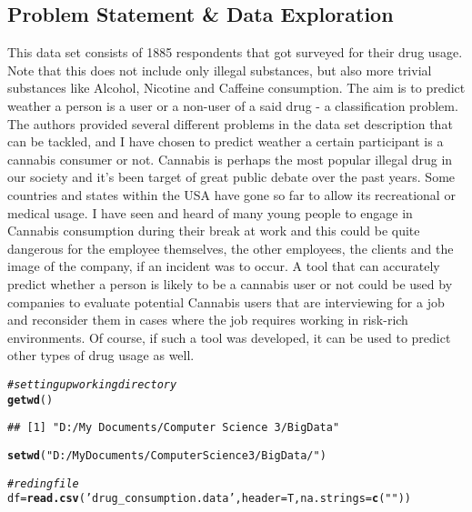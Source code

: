 \documentclass{article}\usepackage[]{graphicx}\usepackage[]{color}
\makeatletter
\newcommand{\hlstr}[1]{\textcolor[rgb]{0.192,0.494,0.8}{#1}}%
\newcommand{\hlcom}[1]{\textcolor[rgb]{0.678,0.584,0.686}{\textit{#1}}}%
\newcommand{\hlstd}[1]{\textcolor[rgb]{0.345,0.345,0.345}{#1}}%
\newcommand{\hlkwb}[1]{\textcolor[rgb]{0.69,0.353,0.396}{#1}}%
\newcommand{\hlkwc}[1]{\textcolor[rgb]{0.333,0.667,0.333}{#1}}%
\newcommand{\hlkwd}[1]{\textcolor[rgb]{0.737,0.353,0.396}{\textbf{#1}}}%
\newenvironment{kframe}{%
 \def\at@end@of@kframe{}%
 \ifinner\ifhmode%
  \def\at@end@of@kframe{\end{minipage}}%
  \begin{minipage}{\columnwidth}%
 \fi\fi%
 \def\FrameCommand##1{\hskip\@totalleftmargin \hskip-\fboxsep
 \colorbox{shadecolor}{##1}\hskip-\fboxsep
     \hskip-\linewidth \hskip-\@totalleftmargin \hskip\columnwidth}%
 \MakeFramed {\advance\hsize-\width
   \@totalleftmargin\z@ \linewidth\hsize
   \@setminipage}}%
 {\par\unskip\endMakeFramed%
 \at@end@of@kframe}
\newenvironment{knitrout}{}{} %
\makeatother
\begin{document}
\subsection{Problem Statement & Data Exploration}
This data set consists of 1885 respondents that got surveyed for their drug usage. Note that this does not include only illegal substances, but also more trivial substances like Alcohol, Nicotine and Caffeine consumption. The aim is to predict weather a person is a user or a non-user of a said drug - a classification problem. The authors provided several different problems in the data set description that can be tackled, and I have chosen to predict weather a certain participant is a cannabis consumer or not. Cannabis is perhaps the most popular illegal drug in our society and it's been target of great public debate over the past years. Some countries and states within the USA have gone so far to allow its recreational or medical usage. I have seen and heard of many young people to engage in Cannabis consumption during their break at work and this could be quite dangerous for the employee themselves, the other employees, the clients and the image of the company, if an incident was to occur. A tool that can accurately predict whether a person is likely to be a cannabis user or not could be used by companies to evaluate potential Cannabis users that are interviewing for a job and reconsider them in cases where the job requires working in risk-rich environments. Of course, if such a tool was developed, it can be used to predict other types of drug usage as well.\\

\begin{knitrout}
\color{fgcolor}\begin{kframe}
\begin{alltt}
\hlcom{#setting up working directory}
\hlkwd{getwd}\hlstd{()}
\end{alltt}
\begin{verbatim}
## [1] "D:/My Documents/Computer Science 3/BigData"
\end{verbatim}
\begin{alltt}
\hlkwd{setwd}\hlstd{(}\hlstr{"D:/My Documents/Computer Science 3/BigData/"}\hlstd{)}

\hlcom{#reding file}
\hlstd{df} \hlkwb{=} \hlkwd{read.csv}\hlstd{(}\hlstr{'drug_consumption.data'}\hlstd{,} \hlkwc{header}\hlstd{=T,} \hlkwc{na.strings}\hlstd{=} \hlkwd{c}\hlstd{(}\hlstr{""}\hlstd{))}
\end{alltt}
\end{kframe}
\end{knitrout}
\end{document}
